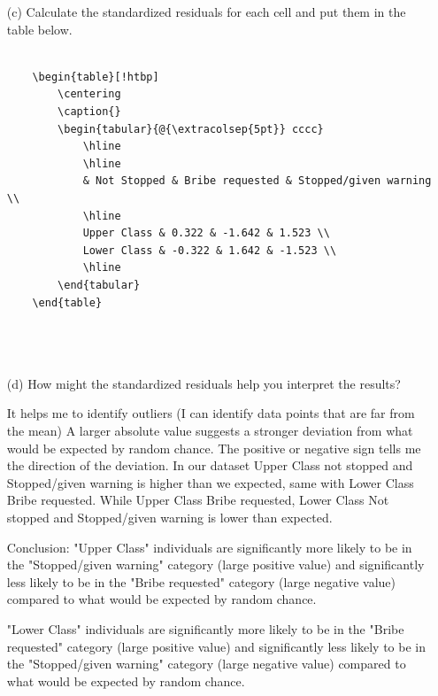 \documentclass[12pt,letterpaper]{article}
\begin{document}
\begin{enumerate}
	
	\newpage
	\item [(c)] Calculate the standardized residuals for each cell and put them in the table below.
	\vspace{1cm}
	
	\begin{verbatim}
		
	\begin{table}[!htbp]
		\centering
		\caption{}
		\begin{tabular}{@{\extracolsep{5pt}} cccc}
			\hline
			\hline
			& Not Stopped & Bribe requested & Stopped/given warning \\
			\hline
			Upper Class & 0.322 & -1.642 & 1.523 \\
			Lower Class & -0.322 & 1.642 & -1.523 \\
			\hline
		\end{tabular}
	\end{table}
	
	
	
\end{verbatim}
	
	\vspace{7cm}
	\item [(d)] How might the standardized residuals help you interpret the results?  
	
	It helps me to identify outliers (I can identify data points that are far from the mean)
	A larger absolute value suggests a stronger deviation from what would be expected by random chance.
	The positive or negative sign tells me the direction of the deviation. In our dataset 
	Upper Class not stopped and Stopped/given warning is higher than we expected, same 
	with Lower Class Bribe requested. While Upper Class Bribe requested, Lower Class Not stopped
	and Stopped/given warning is lower than expected. 
	
	Conclusion: "Upper Class" individuals are significantly more likely to be in the "Stopped/given warning" category
	(large positive value) and significantly less likely to be in the "Bribe requested" category (large negative value)
	compared to what would be expected by random chance.
	
	"Lower Class" individuals are significantly more likely to be in the "Bribe requested" category (large positive value)
	and significantly less likely to be in the "Stopped/given warning" category (large negative value) compared to what
	would be expected by random chance.
	
	
	
\end{enumerate}
\newpage
\end{document}
